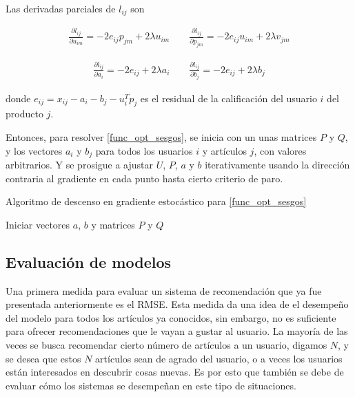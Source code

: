 Las derivadas parciales de $l_{ij}$ son

\[
\begin{split}
\frac{\partial l_{ij}}{\partial u_{im}} = -2 e_{ij} p_{jm} + 2 \lambda u_{im} 
\qquad
\frac{\partial l_{ij}}{\partial p_{jm}} = -2 e_{ij} u_{im} + 2 \lambda v_{jm}
\end{split}
\]

\[
\begin{split}
\frac{\partial l_{ij}}{\partial a_i} = -2 e_{ij} + 2 \lambda a_i 
\qquad
\frac{\partial l_{ij}}{\partial b_j} = -2 e_{ij} + 2 \lambda b_j
\end{split}
\]

donde $e_{ij} =  x_{ij} - a_i - b_j - u_i^T p_j$ es el residual de la calificación del usuario $i$ del producto $j$.

Entonces, para resolver \ref{func_opt_sesgos}, se inicia con un unas matrices $P$ y $Q$, y los vectores $a_i$ y $b_j$ para todos los usuarios $i$ y artículos $j$, con valores arbitrarios. Y se prosigue a ajustar $U$, $P$, $a$ y $b$ iterativamente usando la dirección contraria al gradiente en cada punto hasta cierto criterio de paro.

\begin{algorithm}[ht]
 \caption{Algoritmo de descenso en gradiente estocástico para \ref{func_opt_sesgos}}
    \SetAlgoLined
    Iniciar vectores $a$, $b$ y matrices $P$ y $Q$\\
\end{algorithm}

\subsection{Evaluación de modelos}

Una primera medida para evaluar un sistema de recomendación que ya fue presentada anteriormente es el RMSE. Esta medida da una idea de el desempeño del modelo para todos los artículos ya conocidos, sin embargo, no es suficiente para ofrecer recomendaciones que le vayan a gustar al usuario. La mayoría de las veces se busca recomendar cierto número de artículos a un usuario, digamos $N$, y se desea que estos $N$ artículos sean de agrado del usuario, o a veces los usuarios están interesados en descubrir cosas nuevas. Es por esto que también se debe de evaluar cómo los sistemas se desempeñan en este tipo de situaciones.

